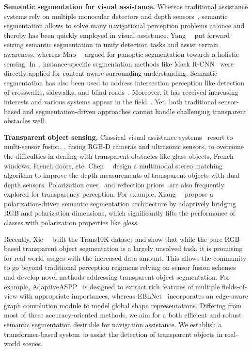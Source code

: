 \documentclass[10pt,twocolumn,letterpaper]{article}
\begin{document}
\noindent\textbf{Semantic segmentation for visual assistance.}
Whereas traditional assistance systems rely on multiple monocular detectors and depth sensors~\cite{aladren2014navigation,cheng2018real,cheng2017crosswalk,lin2018krnet,wang2017enabling}, semantic segmentation allows to solve many navigational perception problems at once and thereby has been quickly employed in visual assistance.
Yang~\etal~\cite{yang2018unifying} put forward seizing semantic segmentation to unify detection tasks and assist terrain awareness, whereas Mao~\etal~\cite{mao2021panoptic} argued for panoptic segmentation towards a holistic sensing. In~\cite{long2019unifying,yohannes2019content}, instance-specific segmentation methods like Mask R-CNN~\cite{he2017mask} were directly applied for content-aware surrounding understanding.
Semantic segmentation has also been used to address intersection perception like detection of crosswalks, sidewalks, and blind roads~\cite{cao2020rapid,hsieh2020outdoor}. Moreover, it has received increasing interests and various systems appear in the field~\cite{constantinescu2020bring,duh2020v,hsieh2020development,lin2019deep,miksik2015semantic}. Yet, both traditional sensor-based and segmentation-driven approaches cannot handle challenging transparent obstacles well.

\noindent\textbf{Transparent object sensing.}
Classical visual assistance systems~\cite{bai2017smart,huang2018glass} resort to multi-sensor fusion, \eg, fusing RGB-D cameras and ultrasonic sensors, to overcome the difficulties in dealing with transparent obstacles like glass objects, French windows, French doors, etc. Chen~\etal~\cite{chen2018improving} design a multimodal stereo matching algorithm to improve the depth measurements of transparent objects with dual depth sensors. Polarization cues~\cite{deep_polarization_cues} and reflection priors~\cite{lin2021rich} are also frequently explored for transparency perception. For example, Xiang~\etal~\cite{xiang2021polarization} propose a polarization-driven semantic segmentation architecture by adaptively bridging RGB and polarization dimensions,
which significantly lifts the performance of classes with polarization properties like \emph{glass}.

Recently, Xie~\etal~\cite{xie2020segmenting,xie2021segmenting} built the Trans10K dataset and show that while the pure RGB-based transparent object segmentation is a largely unsolved task, it is promising for real-world usages with the increased data amount. This allows the community to go beyond traditional perception regimens relying on sensor fusion schemes and develop novel methods addressing transparent object segmentation. For example, AdaptiveASPP~\cite{fakemix} is designed to extract rich features of multiple fields-of-view with appropriate importances, whereas EBLNet~\cite{enhanced_boundary_learning} incorporates an edge-aware graph convolution module to model global shape representations.
Differing from most of these accuracy-oriented methods, we aim for a both efficient and robust semantic segmentation desirable for navigation assistance. We establish a transformer-based system to assist the detection of transparent objects in real-world scenes.
\end{document}
